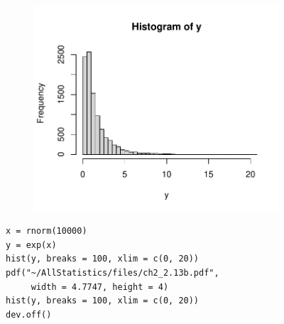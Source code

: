 \begin{figure}[H]
    \begin{minipage}{0.5\textwidth}
        \begin{center}
            \begin{figure}[H]
            \includegraphics[scale=0.65]{ch2_2.13b.pdf}
            \end{figure}
        \end{center}
    \end{minipage}
    \begin{minipage}{0.5\textwidth}
    \begin{lstlisting}[style=RSyntax]
x = rnorm(10000)
y = exp(x)
hist(y, breaks = 100, xlim = c(0, 20))
pdf("~/AllStatistics/files/ch2_2.13b.pdf",
     width = 4.7747, height = 4)
hist(y, breaks = 100, xlim = c(0, 20))
dev.off()
    \end{lstlisting}
    \rule{0pt}{55pt}
\end{minipage}
\end{figure}






